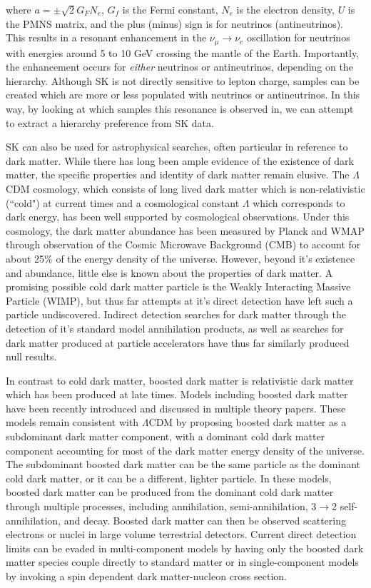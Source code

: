 \documentclass[12pt,oneside,openright]{article}
\begin{document}
where $a=\pm\sqrt{2}G_FN_e$, $G_f$ is the Fermi constant, $N_e$ is the electron density, $U$ is the PMNS matrix, and the plus (minus) sign is for neutrinos (antineutrinos).  This results in a resonant enhancement in the $\nu_\mu \rightarrow \nu_e$ oscillation for neutrinos with energies around 5 to 10 GeV crossing the mantle of the Earth.  Importantly, the enhancement occurs for \emph{either} neutrinos or antineutrinos, depending on the hierarchy.  Although SK is not directly sensitive to lepton charge, samples can be created which are more or less populated with neutrinos or antineutrinos.  In this way, by looking at which samples this resonance is observed in, we can attempt to extract a hierarchy preference from SK data.  \par
SK can also be used for astrophysical searches, often particular in reference to dark matter.  While there has long been ample evidence of the existence of dark matter, the specific properties and identity of dark matter remain elusive.  The $\Lambda$CDM cosmology, which consists of long lived dark matter which is non-relativistic (``cold") at current times and a cosmological constant $\Lambda$ which corresponds to dark energy, has been well supported by cosmological observations.  Under this cosmology, the dark matter abundance has been measured by Planck and WMAP through observation of the Cosmic Microwave Background (CMB) to account for about 25\% of the energy density of the universe.  However, beyond it's existence and abundance, little else is known about the properties of dark matter.  A promising possible cold dark matter particle is the Weakly Interacting Massive Particle (WIMP), but thus far attempts at it's direct detection have left such a particle undiscovered. Indirect detection searches for dark matter through the detection of it's standard model annihilation products, as well as searches for dark matter produced at particle accelerators have thus far similarly produced null results.\par   
In contrast to cold dark matter, boosted dark matter is relativistic dark matter which has been produced at late times.  Models including boosted dark matter have been recently introduced and discussed in multiple theory papers.  These models remain consistent with $\Lambda$CDM by proposing boosted dark matter as a subdominant dark matter component, with a dominant cold dark matter component accounting for most of the dark matter energy density of the universe.  The subdominant boosted dark matter can be the same particle as the dominant cold dark matter, or it can be a different, lighter particle.  In these models, boosted dark matter can be produced from the dominant cold dark matter through multiple processes, including annihilation, semi-annihilation, 3$\rightarrow$2 self-annihilation, and decay.  Boosted dark matter can then be observed scattering electrons or nuclei in large volume terrestrial detectors.  Current direct detection limits can be evaded in multi-component models by having only the boosted dark matter species couple directly to standard matter or in single-component models by invoking a spin dependent dark matter-nucleon cross section. \par
\end{document}
